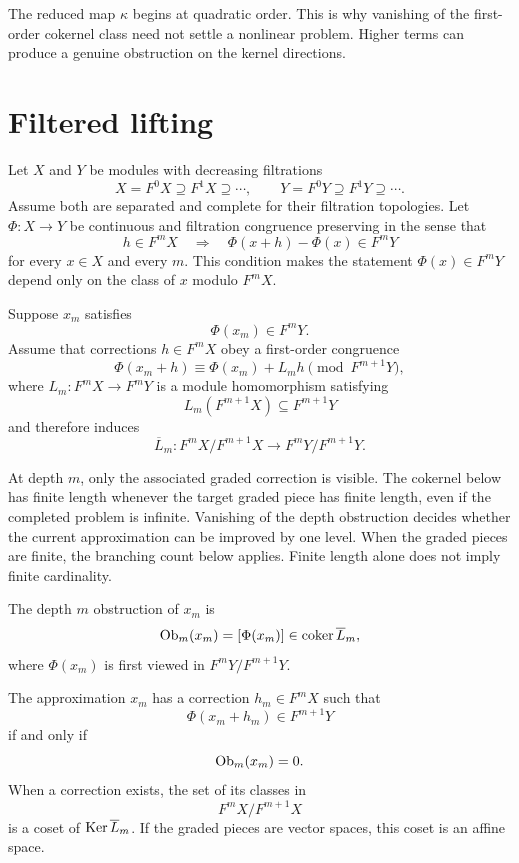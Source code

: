 \begin{remark}\label{rem:higher_obstruction}
The reduced map $\kappa$ begins at quadratic order.  This is why vanishing of the first-order cokernel class need not settle a nonlinear problem.  Higher terms can produce a genuine obstruction on the kernel directions.
\end{remark}

\section{Filtered lifting}\label{sec:filtered_lifting}

Let $X$ and $Y$ be modules with decreasing filtrations
\[
X=F^0X\supseteq F^1X\supseteq\cdots,
\qquad
Y=F^0Y\supseteq F^1Y\supseteq\cdots.
\]
Assume both are separated and complete for their filtration topologies.  Let $\Phi:X\to Y$ be continuous and filtration congruence preserving in the sense that
\[
h\in F^mX
\quad\Longrightarrow\quad
\Phi(x+h)-\Phi(x)\in F^mY
\]
for every $x\in X$ and every $m$.  This condition makes the statement $\Phi(x)\in F^mY$ depend only on the class of $x$ modulo $F^mX$.

Suppose $x_m$ satisfies
\[
\Phi(x_m)\in F^mY.
\]
Assume that corrections $h\in F^mX$ obey a first-order congruence
\[
\Phi(x_m+h)
\equiv
\Phi(x_m)+L_mh
\pmod{F^{m+1}Y},
\]
where $L_m:F^mX\to F^mY$ is a module homomorphism satisfying
\[
L_m(F^{m+1}X)\subseteq F^{m+1}Y
\]
and therefore induces
\[
\overline L_m:
F^mX/F^{m+1}X
\longrightarrow
F^mY/F^{m+1}Y.
\]


At depth $m$, only the associated graded correction is visible. The cokernel below has finite length whenever the target graded piece has finite length, even if the completed problem is infinite. Vanishing of the depth obstruction decides whether the current approximation can be improved by one level. When the graded pieces are finite, the branching count below applies. Finite length alone does not imply finite cardinality.

\begin{definition}\label{def:depth_obstruction}
The depth $m$ obstruction of $x_m$ is
\[
\operatorname{Ob}_m(x_m)
=
[\Phi(x_m)]
\in
\operatorname{coker}\overline L_m,
\]
where $\Phi(x_m)$ is first viewed in $F^mY/F^{m+1}Y$.
\end{definition}

\begin{theorem}\label{thm:one_step_lifting}
The approximation $x_m$ has a correction $h_m\in F^mX$ such that
\[
\Phi(x_m+h_m)\in F^{m+1}Y
\]
if and only if
\[
\operatorname{Ob}_m(x_m)=0.
\]
When a correction exists, the set of its classes in
\[
F^mX/F^{m+1}X
\]
is a coset of $\operatorname{Ker}\overline L_m$.  If the graded pieces are vector spaces, this coset is an affine space.
\end{theorem}

